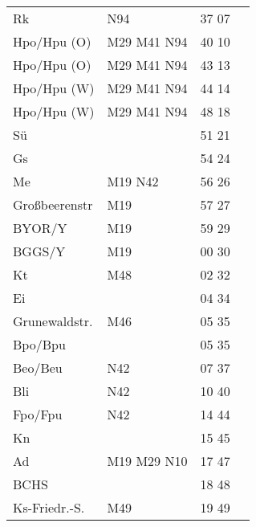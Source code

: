 \begin{tabular}{!{\color{schiefergrau}\vrule width 3pt}*{4}{l!{\color{schiefergrau}\vrule width 3pt}}}
Rk           & \nbus{} N94                                 & 37 07 &       \\
Hpo/Hpu (O)  & \nuacht{} \mbus{} M29 M41 \nbus{} N94       & 40 10 &       \\
\hline
Hpo/Hpu (O)  & \nuacht{} \mbus{} M29 M41 \nbus{} N94       & 43 13 &       \\
Hpo/Hpu (W)  & \nuacht{} \mbus{} M29 M41 \nbus{} N94       & 44 14 &       \\
\hline
Hpo/Hpu (W)  & \nuacht{} \mbus{} M29 M41 \nbus{} N94       & 48 18 &       \\
Sü           &                                             & 51 21 &       \\
Gs           &                                             & 54 24 &       \\
Me           & \nusechs{} \mbus{} M19 \nbus{} N42          & 56 26 &       \\
Großbeerenstr& \mbus{} M19                                 & 57 27 &       \\
BYOR/Y       & \mbus{} M19                                 & 59 29 &       \\
BGGS/Y       & \mbus{} M19                                 & 00 30 &       \\
Kt           & \mbus{} M48                                 & 02 32 &       \\
Ei           &                                             & 04 34 &       \\
Grunewaldstr.& \mbus{} M46                                 & 05 35 &       \\
Bpo/Bpu      &                                             & 05 35 &       \\
Beo/Beu      & \nuneun{} \nbus{} N42                       & 07 37 &       \\
Bli          & \nbus{} N42                                 & 10 40 &       \\
Fpo/Fpu      & \nudrei{} \nbus{} N42                       & 14 44 &       \\
Kn           &                                             & 15 45 &       \\
Ad           & \mbus{} M19 M29 \nbus{} N10                 & 17 47 &       \\
BCHS         &                                             & 18 48 &       \\
Ks-Friedr.-S.& \mbus{} M49                                 & 19 49 &       \\

\end{tabular}
